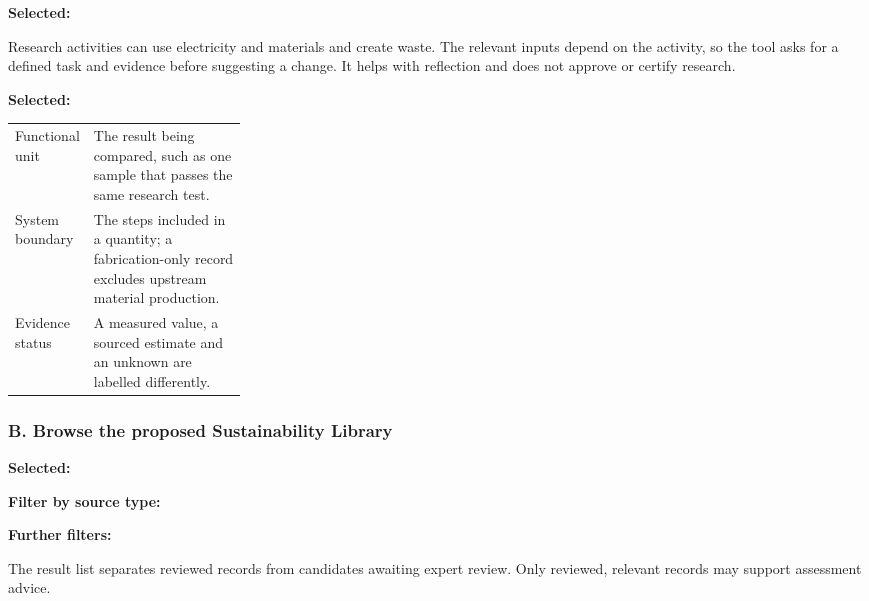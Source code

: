 \begin{learnscreen}
\textbf{Selected:} \par
Research activities can use electricity and materials and create waste. The relevant inputs depend on the activity, so the tool asks for a defined task and evidence before suggesting a change. It helps with reflection and does not approve or certify research.\par\medskip
{}\quad
{}\quad
{}
\end{learnscreen}

\begin{learnscreen}
\textbf{Selected:} \par
\begin{tabularx}{\linewidth}{@{}>{\raggedright\arraybackslash}p{0.27\linewidth}X@{}}
Functional unit & The result being compared, such as one sample that passes the same research test. \\
System boundary & The steps included in a quantity; a fabrication-only record excludes upstream material production. \\
Evidence status & A measured value, a sourced estimate and an unknown are labelled differently. \\
\end{tabularx}
\medskip{}\quad
{}\quad
{}
\end{learnscreen}

\pagebreak
\subsubsection*{B. Browse the proposed Sustainability Library}
\begin{learnscreen}
\textbf{Selected:} \par
\textbf{Filter by source type:}\quad
{}\quad
{}\quad
{}\quad
{}\quad
{}\par
\textbf{Further filters:}\quad
{}\quad
{}\quad
{}\quad
{}\par\medskip
The result list separates reviewed records from candidates awaiting expert review. Only reviewed, relevant records may support assessment advice.
\end{learnscreen}


